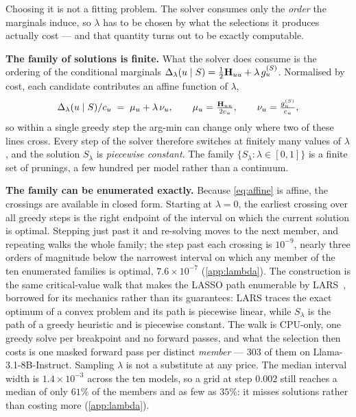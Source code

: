 Choosing it is not a fitting problem. The solver consumes only the \emph{order} the marginals
induce, so $\lambda$ has to be chosen by what the selections it produces actually cost --- and that
quantity turns out to be exactly computable.

\textbf{The family of solutions is finite.} What the solver does consume is the ordering of the
conditional marginals $\Delta_\lambda(u\mid S)=\tfrac12\mathbf{H}_{uu}+\lambda\,g_u^{(S)}$. Normalised by
cost, each candidate contributes an affine function of $\lambda$,
\begin{equation}
\Delta_\lambda(u\mid S)/c_u \;=\; \mu_u+\lambda\,\nu_u,
\qquad \mu_u=\tfrac{\mathbf{H}_{uu}}{2c_u},\qquad \nu_u=\tfrac{g_u^{(S)}}{c_u},
\label{eq:affine}
\end{equation}
so within a single greedy step the arg-min can change only where two of these lines cross. Every step of the solver therefore switches at finitely many values of $\lambda$, and the solution
$S_\lambda$ is \emph{piecewise constant}. The family $\{S_\lambda:\lambda\in[0,1]\}$ is a finite set of
prunings, a few hundred per model rather than a continuum.

\textbf{The family can be enumerated exactly.} Because \cref{eq:affine} is affine, the crossings are
available in closed form. Starting at $\lambda\!=\!0$, the earliest crossing over all greedy steps is the right endpoint of the
interval on which the current solution is optimal. Stepping just past it and re-solving moves to the
next member, and repeating walks the whole family; the step past each crossing is $10^{-9}$, nearly
three orders of magnitude below the narrowest interval on which any member of the ten enumerated
families is optimal, $7.6\times10^{-7}$ (\cref{app:lambda}). The construction is the same critical-value walk that makes the
LASSO path enumerable by LARS~\citep{efron2004lars}, borrowed for its mechanics rather than its
guarantees: LARS traces the exact optimum of a convex problem and its path is piecewise linear, while
$S_\lambda$ is the path of a greedy heuristic and is piecewise constant. The walk is CPU-only, one greedy solve per breakpoint and no
forward passes, and what the selection then costs is one masked forward pass per distinct
\emph{member} --- $303$ of them on Llama-3.1-8B-Instruct. Sampling $\lambda$ is not a substitute at any
price. The median interval width is $1.4\times10^{-3}$ across the ten models, so a grid at step $0.002$
still reaches a median of only $61\%$ of the members and as few as $35\%$: it misses solutions rather
than costing more (\cref{app:lambda}).


